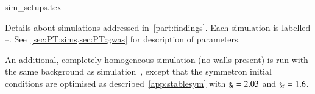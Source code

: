     \begin{table}[h]
        {sim_setups.tex}
        \caption{Details about simulations addressed in~\cref{part:findings}. Each simulation is labelled --. See~\cref{sec:PT:sims,sec:PT:gwas} for description of parameters.} %
        \label{tab:PT:sims:sim_setups}
    \end{table}



    An additional, completely homogeneous simulation (no walls present) is run with the same background as simulation~, except that the symmetron initial conditions are optimised as described~\cref{app:stablesym} with $\mathfrak{z}_\mathrm{i}=2.03$ and $\mathfrak{z}_\mathrm{f}=1.6$. %
    
    







